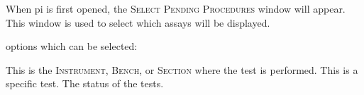 When \gls{pi} is first opened, the \textsc{Select Pending Procedures} window will appear. This window is used to select which assays will be displayed.\\


 options which can be selected:

\begin{description}
     This is the \textsc{Instrument, Bench,} or \textsc{Section} where the test is performed.
     This is a specific test.
     The status of the tests.
\end{description}
